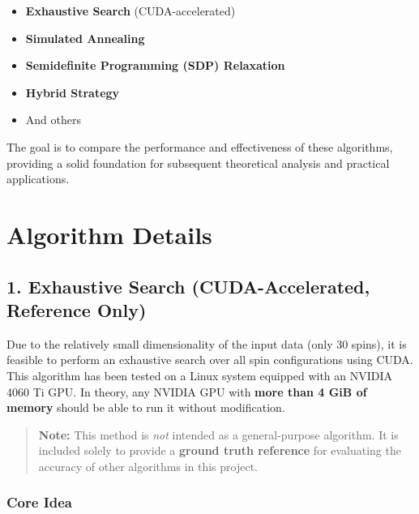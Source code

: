 \documentclass{article}
\begin{document}
\begin{itemize}
    \item \textbf{Exhaustive Search} (CUDA-accelerated)
    \item \textbf{Simulated Annealing}
    \item \textbf{Semidefinite Programming (SDP) Relaxation}
    \item \textbf{Hybrid Strategy}
    \item And others
\end{itemize}

The goal is to compare the performance and effectiveness of these algorithms, providing a solid foundation for subsequent theoretical analysis and practical applications.

\section*{Algorithm Details}

\subsection*{1. Exhaustive Search (CUDA-Accelerated, Reference Only)}

Due to the relatively small dimensionality of the input data (only 30 spins), it is feasible to perform an exhaustive search over all spin configurations using CUDA. This algorithm has been tested on a Linux system equipped with an NVIDIA 4060 Ti GPU. In theory, any NVIDIA GPU with \textbf{more than 4 GiB of memory} should be able to run it without modification.

\begin{quote}
\textbf{Note:} This method is \textit{not} intended as a general-purpose algorithm. It is included solely to provide a \textbf{ground truth reference} for evaluating the accuracy of other algorithms in this project.
\end{quote}

\subsubsection*{Core Idea}
\end{document}
